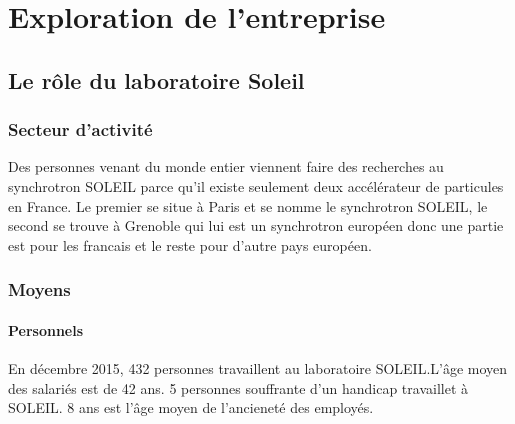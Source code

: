 \chapter{Exploration de l'entreprise}
	\minitoc






\section{Le rôle du laboratoire Soleil}

	\subsection{Secteur d'activit\'e}
				Des personnes venant du monde entier viennent faire des recherches au synchrotron SOLEIL parce qu'il existe seulement deux accélérateur de particules en France. Le premier se situe à Paris et se nomme le synchrotron SOLEIL, le second se trouve à Grenoble qui lui est un synchrotron européen donc une partie est pour les francais et le reste pour d'autre pays européen.
	\subsection{Moyens}
		\subsubsection{Personnels}
				En décembre 2015, 432 personnes travaillent au laboratoire SOLEIL.L'âge moyen des salariés est de 42 ans. 5 personnes souffrante d'un handicap travaillet à SOLEIL. 8 ans est l'âge moyen de l'ancieneté des employés.

